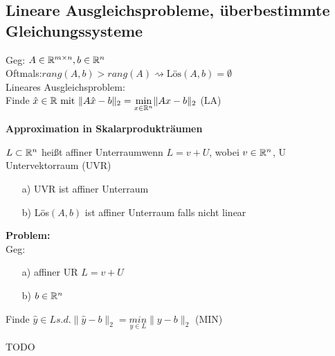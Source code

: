 \subsection{Lineare Ausgleichsprobleme, überbestimmte Gleichungssysteme}
Geg: $A \in \mathbb R^{m\times n}, b\in \mathbb R^n$\\
Oftmals:$rang(A,b)>rang(A) \rightsquigarrow \text{Lös}(A,b) = \emptyset$\\

Lineares Ausgleichsproblem:\\
Finde $\hat{x} \in \mathbb R \text{ mit } \|A\hat{x}-b\|_2 = \underset{x \in \mathbb R^n}{\mathrm{min}}\|Ax-b\|_2$ (LA)\\
\begin{Exkurs}\textbf{Approximation in Skalarprodukträumen}\\
\begin{Definition}
$L \subset \mathbb R^n$ heißt \glqq affiner Unterraum\grqq wenn $L=v+U$, wobei $v \in \mathbb R^n$, U Untervektorraum (UVR)
\end{Definition}
\begin{Beispiel}\hfill
	\begin{itemize}
	\item[a)] UVR ist affiner Unterraum
	\item[b)] Lös$(A,b)$ ist affiner Unterraum falls nicht linear
	\end{itemize}
\end{Beispiel}
\textbf{Problem:}\\
Geg: \begin{itemize}
	 \item[a)] affiner UR $L=v+U$
	 \item[b)] $b \in \mathbb R^n$
	 \end{itemize}
Finde $\hat{y} \in L s.d. \|\hat{y}-b\|_2 = \underset{y \in L}{min} \|y-b\|_2$ (MIN)\\
\begin{Satz}
TODO
\end{Satz}
\end{Exkurs} 
